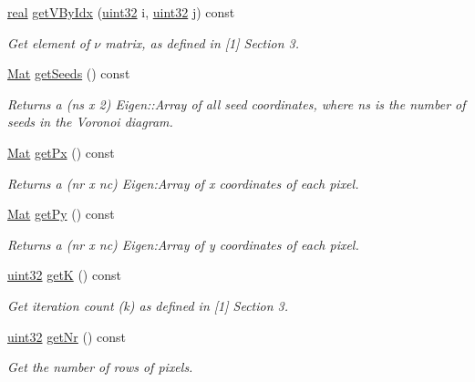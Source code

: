 \begin{DoxyCompactItemize}
\mbox{\hyperlink{typedefs_8h_a58a0c7cf2501f4492da833421be92547}{real}} \mbox{\hyperlink{classvd_a640ed20e4618abd409e180a707eea3b1}{get\+V\+By\+Idx}} (\mbox{\hyperlink{typedefs_8h_a8ad23e2333787a214e20a58a284a5a60}{uint32}} i, \mbox{\hyperlink{typedefs_8h_a8ad23e2333787a214e20a58a284a5a60}{uint32}} j) const
\begin{DoxyCompactList}\small\item\em Get element of $\nu$ matrix, as defined in \mbox{[}1\mbox{]} Section 3. \end{DoxyCompactList}\item 
\mbox{\hyperlink{typedefs_8h_a9fa28c1f74e909474857584f5c7b0088}{Mat}} \mbox{\hyperlink{classvd_a82f353c594c3c6b24f6077398f059d3a}{get\+Seeds}} () const
\begin{DoxyCompactList}\small\item\em Returns a (ns x 2) Eigen\+::\+Array of all seed coordinates, where ns is the number of seeds in the Voronoi diagram. \end{DoxyCompactList}\item 
\mbox{\hyperlink{typedefs_8h_a9fa28c1f74e909474857584f5c7b0088}{Mat}} \mbox{\hyperlink{classvd_aeba6d318016c8f8b9537ce4c0314f8cd}{get\+Px}} () const
\begin{DoxyCompactList}\small\item\em Returns a (nr x nc) Eigen\+:Array of x coordinates of each pixel. \end{DoxyCompactList}\item 
\mbox{\hyperlink{typedefs_8h_a9fa28c1f74e909474857584f5c7b0088}{Mat}} \mbox{\hyperlink{classvd_a9738711704b1d03cdbe027b1976cb0c6}{get\+Py}} () const
\begin{DoxyCompactList}\small\item\em Returns a (nr x nc) Eigen\+:Array of y coordinates of each pixel. \end{DoxyCompactList}\item 
\mbox{\hyperlink{typedefs_8h_a8ad23e2333787a214e20a58a284a5a60}{uint32}} \mbox{\hyperlink{classvd_ae145808dbbebfc984811eb48a6a57585}{getK}} () const
\begin{DoxyCompactList}\small\item\em Get iteration count (k) as defined in \mbox{[}1\mbox{]} Section 3. \end{DoxyCompactList}\item 
\mbox{\hyperlink{typedefs_8h_a8ad23e2333787a214e20a58a284a5a60}{uint32}} \mbox{\hyperlink{classvd_afda5d6b3eb04899e1b31c5ee3a3af527}{get\+Nr}} () const
\begin{DoxyCompactList}\small\item\em Get the number of rows of pixels. \end{DoxyCompactList}\item 

\end{DoxyCompactItemize}
